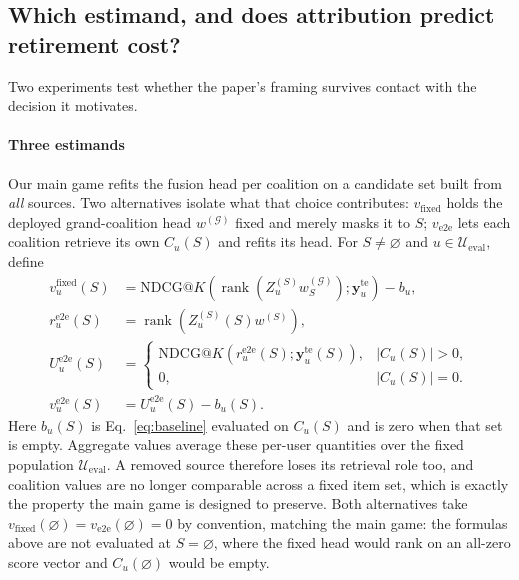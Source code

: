 \documentclass[pdflatex,sn-basic,Numbered]{sn-jnl}
\makeatletter
\theoremstyle{plain}
\theoremstyle{definition}
\newcommand{\G}{\mathcal{G}}
\newcommand{\Ueval}{\mathcal{U}_{\mathrm{eval}}}
\newcommand{\NDCGat}[1]{\mathrm{NDCG@}#1}
\makeatother
\begin{document}
\subsection{Which estimand, and does attribution predict retirement cost?}
\label{sec:estimands}

Two experiments test whether the paper's framing survives contact with the
decision it motivates.

\paragraph{Three estimands}
Our main game refits the fusion head per coalition on a candidate set built
from \emph{all} sources. Two alternatives isolate what that choice contributes:
$v_{\mathrm{fixed}}$ holds the deployed grand-coalition head $w^{(\G)}$ fixed
and merely masks it to $S$; $v_{\mathrm{e2e}}$ lets each coalition retrieve
its own $C_u(S)$ and refits its head. For $S\ne\varnothing$ and
$u\in\Ueval$, define
\begin{align}
v^{\mathrm{fixed}}_u(S)
  &= \NDCGat{K}\!\left(\operatorname{rank}(Z_u^{(S)}w^{(\G)}_S);
       \mathbf y_u^{\mathrm{te}}\right)-b_u,
       \label{eq:fixed-game}\\
r_u^{\mathrm{e2e}}(S)
  &= \operatorname{rank}\!\left(Z_u^{(S)}(S)w^{(S)}\right),\\
U^{\mathrm{e2e}}_u(S)
  &=
\begin{cases}
\NDCGat{K}\!\left(r_u^{\mathrm{e2e}}(S);\mathbf y_u^{\mathrm{te}}(S)\right),
       & |C_u(S)|>0,\\
0, & |C_u(S)|=0.
\end{cases}\\
v^{\mathrm{e2e}}_u(S)
  &= U^{\mathrm{e2e}}_u(S)-b_u(S).
\label{eq:e2e-game}
\end{align}
Here $b_u(S)$ is Eq.~\eqref{eq:baseline} evaluated on $C_u(S)$ and is zero
when that set is empty. Aggregate values average these per-user quantities over
the fixed population $\Ueval$. A
removed source therefore loses its retrieval role too, and coalition values are
no longer comparable across a fixed item set, which is exactly the property the
main game is designed to preserve. Both alternatives take
$v_{\mathrm{fixed}}(\varnothing) = v_{\mathrm{e2e}}(\varnothing) = 0$ by
convention, matching the main game: the formulas above are not evaluated at
$S = \varnothing$, where the fixed head would rank on an all-zero score vector
and $C_u(\varnothing)$ would be empty.
\end{document}
